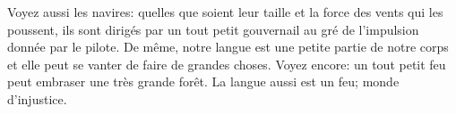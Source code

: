 Voyez aussi les navires:
	quelles que soient leur taille et la force des vents qui les poussent,
	ils sont dirigés par un tout petit gouvernail
	au gré de l’impulsion donnée par le pilote.
De même, notre langue est une petite partie de notre corps
	et elle peut se vanter de faire de grandes choses.
Voyez encore:
	un tout petit feu peut embraser une très grande forêt.
La langue aussi est un feu; monde d’injustice.
